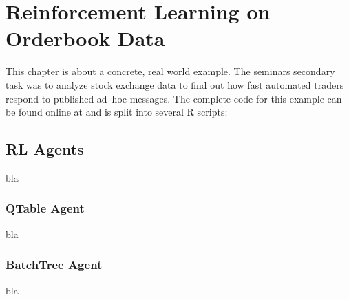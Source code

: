 \chapter{Reinforcement Learning on Orderbook Data}
\label{chap:reinforcementlearning}
This chapter is about a concrete, real world example. The seminars secondary task was to analyze stock exchange data to find out how fast automated traders respond to published ad~hoc messages. The complete code for this example can be found online at \cite{GitHubAxelPerschmann} and is split into several R scripts:\\

\section{RL Agents}
bla

\subsection{QTable Agent}
bla

\subsection{BatchTree Agent}
bla

